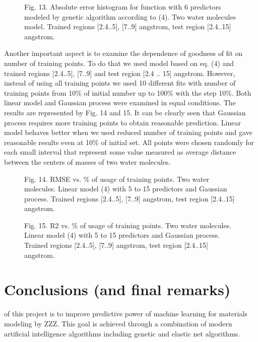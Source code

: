 \documentclass[aps,prl,reprint,amsmath,amssymb,nature]{revtex4-1}
\begin{document}
\begin{figure}[h]
\centering
\caption{Fig. 13. Absolute error histogram for function with 6 
predictors modeled by genetic algorithm according to (4). Two water 
molecules model. Trained regions $[$2.4..5$]$, $[$7..9$]$ angstrom, test 
region $[$2.4..15$]$ angstrom.}
\end{figure}

Another important aspect is to examine the dependence of goodness of fit 
on number of training points. To do that we used model based on eq. (4) 
and trained regions $[$2.4..5$]$, $[$7..9$]$ and test region $[$2.4 .. 
15$]$ angstrom. However, instead of using all training points we used 10 
different fits with number of training points from 10\% of initial 
number up to 100\% with the step 10\%. Both linear model and Gaussian 
process were examined in equal conditions. The results are represented 
by Fig. 14 and 15. It can be clearly seen that Gaussian process requires 
more training points to obtain reasonable prediction. Linear model 
behaves better when we used reduced number of training points and gave 
reasonable results even at 10\% of initial set. All points were chosen 
randomly for each small interval that represent some value measured as 
average distance between the centers of masses of two water molecules. 

\begin{figure}[h]
\centering
\caption{Fig. 14. RMSE vs. \% of usage of training points. Two water 
molecules. Linear model (4) with 5 to 15 predictors and Gaussian 
process. Trained regions $[$2.4..5$]$, $[$7..9$]$ angstrom, test region 
$[$2.4..15$]$ angstrom.}
\end{figure}


\begin{figure}[h]
\centering
\caption{Fig. 15. R2 vs. \% of usage of training points. Two water 
molecules. Linear model (4) with 5 to 15 predictors and Gaussian 
process. Trained regions $[$2.4..5$]$, $[$7..9$]$ angstrom, test region 
$[$2.4..15$]$ angstrom.}
\end{figure}


\section{Conclusions (and final remarks)}

of this project is to improve predictive power of machine learning for 
materials modeling by ZZZ. This goal is achieved through a combination 
of modern artificial intelligence algorithms including genetic and 
elastic net algorithms.
\end{document}
